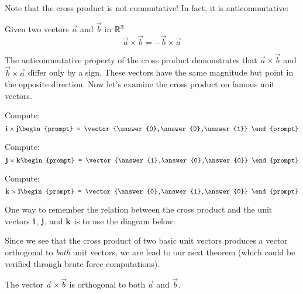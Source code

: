 \documentclass{ximera}
\begin{document}
Note that the cross product is not commutative! In fact, it is
anticommutative:

\begin{theorem}
  Given two vectors $\vec{a}$ and $\vec{b}$ in $\mathbb R^3$
  \[
  \vec{a} \times\vec{b} = -\vec{b}\times\vec{a}
  \]
\end{theorem}
The anticommutative property of the cross product demonstrates that
$\vec{a}\times\vec{b}$ and $\vec{b}\times\vec{a}$ differ only by a
sign. These vectors have the same magnitude but point in the opposite
direction. Now let's examine the cross product on famous unit vectors.
\begin{question}
  Compute:
  \[
  \veci \times \vecj
  \begin{prompt}
    = \vector{\answer{0},\answer{0},\answer{1}}
  \end{prompt}
  \]
  \begin{question}
  Compute:
  \[
  \vecj\times\veck 
  \begin{prompt}
    = \vector{\answer{1},\answer{0},\answer{0}}
  \end{prompt}
  \]
  \begin{question}
  Compute:
  \[
  \veck\times\veci 
  \begin{prompt}
    = \vector{\answer{0},\answer{1},\answer{0}}
  \end{prompt}
  \]
\end{question}
\end{question}
\end{question}

One way to remember the relation between the cross product and the unit vectors $\mathbf{i}$, $\mathbf{j}$, and $\mathbf{k}$ is to use the diagram below:
\begin{image}
\end{image}

Since we see that the cross product of two basic unit vectors produces
a vector orthogonal to \textit{both} unit vectors, we are lead to our
next theorem (which could be verified through brute force
computations).

\begin{theorem}
  The vector $\vec{a}\times\vec{b}$ is orthogonal to both $\vec{a}$
  and $\vec{b}$.
\end{theorem}
\end{document}
